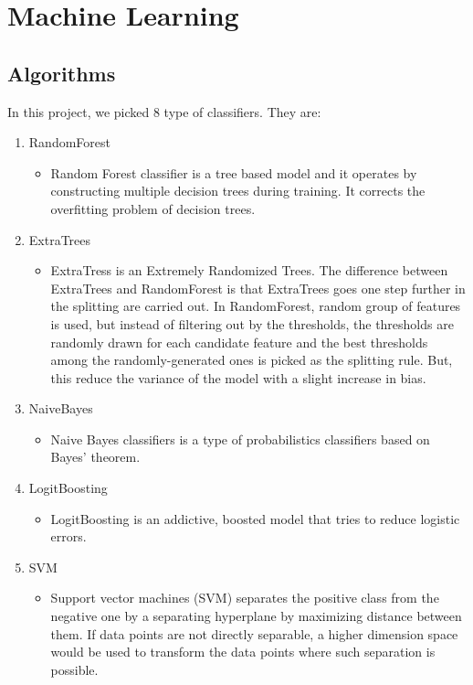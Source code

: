\chapter{Machine Learning}

\section{Algorithms}
In this project, we picked 8 type of classifiers. They are:
\begin{enumerate}
    \item RandomForest
        \begin{itemize}
            \item Random Forest classifier is a tree based model and it operates by constructing multiple decision trees during training. It corrects the overfitting problem of decision trees.
        \end{itemize}
    \item ExtraTrees
        \begin{itemize}
            \item  
            ExtraTress is an Extremely Randomized Trees. The difference between ExtraTrees and RandomForest is that ExtraTrees goes one step further in the splitting are carried out. In RandomForest, random group of features is used, but instead of filtering out by the thresholds, the thresholds are randomly drawn for each candidate feature and the best thresholds among the randomly-generated ones is picked as the splitting rule. But, this reduce the variance of the model with a slight increase in bias.
        \end{itemize}
    \item NaiveBayes
        \begin{itemize}
            \item Naive Bayes classifiers is a type of probabilistics classifiers based on Bayes' theorem. 
        \end{itemize}
    \item LogitBoosting
        \begin{itemize}
            \item LogitBoosting is an addictive, boosted model that tries to reduce logistic errors.
        \end{itemize}
    \item SVM
        \begin{itemize}
            \item Support vector machines (SVM) separates the positive class from the negative one by a separating hyperplane by maximizing distance between them. If data points are not directly separable, a higher dimension space would be used to transform the data points where such separation is possible.

\end{itemize}
\end{enumerate}
